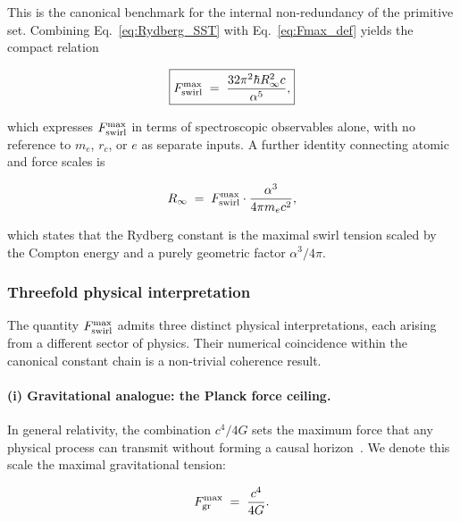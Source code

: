 \documentclass[11pt]{article}
\theoremstyle{definition}
\theoremstyle{plain}
\theoremstyle{remark}
\newcommand{\rc}{{r_c}}
\begin{document}
        This is the canonical benchmark for the internal non-redundancy of the primitive set. Combining Eq.~\eqref{eq:Rydberg_SST} with Eq.~\eqref{eq:Fmax_def} yields the compact relation

        \begin{align}
            \boxed{
            F_{\rm swirl}^{\max}
            \;=\; \frac{32\pi^2\hbar R_\infty^2 c}{\alpha^5},
            }
            \label{eq:Fmax_Rydberg}
        \end{align}

        which expresses $F_{\rm swirl}^{\max}$ in terms of spectroscopic observables alone, with no reference to $m_e$, $\rc$, or $e$ as separate inputs. A further identity connecting atomic and force scales is

        \begin{align}
            R_\infty \;=\; F_{\rm swirl}^{\max} \cdot \frac{\alpha^3}{4\pi m_e c^2},
            \label{eq:Rydberg_Fmax}
        \end{align}

        which states that the Rydberg constant is the maximal swirl tension scaled by the Compton energy and a purely geometric factor $\alpha^3/4\pi$.

        \subsubsection{Threefold physical interpretation}

        The quantity $F_{\rm swirl}^{\max}$ admits three distinct physical interpretations, each arising from a different sector of physics. Their numerical coincidence within the canonical constant chain is a non-trivial coherence result.

        \paragraph{(i) Gravitational analogue: the Planck force ceiling.}

        In general relativity, the combination $c^4/4G$ sets the maximum force that any physical process can transmit without forming a causal horizon~\cite{Gibbons2002}. We denote this scale the maximal gravitational tension:

        \begin{align}
            F_{\rm gr}^{\max} \;=\; \frac{c^4}{4G}.
            \label{eq:Fgr}
        \end{align}
\end{document}
